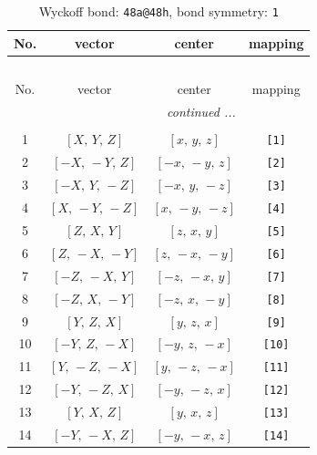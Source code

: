 \documentclass[fleqn,8pt]{jsarticle}
\begin{document}
\begin{longtable}{cccc}
\caption{Wyckoff bond: {\tt 48a@48h}, bond symmetry: {\tt 1}}
 \\
 \hline \hline
No. & vector & center & mapping \\ \hline \endfirsthead

\multicolumn{3}{l}{\tablename\ \thetable{}} \\
 \hline \hline
No. & vector & center & mapping \\ \hline \endhead

 \hline \hline
\multicolumn{3}{r}{\footnotesize\it continued ...} \\ \endfoot

 \hline \hline
\multicolumn{3}{r}{} \\ \endlastfoot

1 & $\left[ X,\, Y,\, Z \right]$ & $\left[ x,\, y,\, z \right]$ & {\tt [1]} \\ \hline
2 & $\left[ - X,\, - Y,\, Z \right]$ & $\left[ - x,\, - y,\, z \right]$ & {\tt [2]} \\ \hline
3 & $\left[ - X,\, Y,\, - Z \right]$ & $\left[ - x,\, y,\, - z \right]$ & {\tt [3]} \\ \hline
4 & $\left[ X,\, - Y,\, - Z \right]$ & $\left[ x,\, - y,\, - z \right]$ & {\tt [4]} \\ \hline
5 & $\left[ Z,\, X,\, Y \right]$ & $\left[ z,\, x,\, y \right]$ & {\tt [5]} \\ \hline
6 & $\left[ Z,\, - X,\, - Y \right]$ & $\left[ z,\, - x,\, - y \right]$ & {\tt [6]} \\ \hline
7 & $\left[ - Z,\, - X,\, Y \right]$ & $\left[ - z,\, - x,\, y \right]$ & {\tt [7]} \\ \hline
8 & $\left[ - Z,\, X,\, - Y \right]$ & $\left[ - z,\, x,\, - y \right]$ & {\tt [8]} \\ \hline
9 & $\left[ Y,\, Z,\, X \right]$ & $\left[ y,\, z,\, x \right]$ & {\tt [9]} \\ \hline
10 & $\left[ - Y,\, Z,\, - X \right]$ & $\left[ - y,\, z,\, - x \right]$ & {\tt [10]} \\ \hline
11 & $\left[ Y,\, - Z,\, - X \right]$ & $\left[ y,\, - z,\, - x \right]$ & {\tt [11]} \\ \hline
12 & $\left[ - Y,\, - Z,\, X \right]$ & $\left[ - y,\, - z,\, x \right]$ & {\tt [12]} \\ \hline
13 & $\left[ Y,\, X,\, Z \right]$ & $\left[ y,\, x,\, z \right]$ & {\tt [13]} \\ \hline
14 & $\left[ - Y,\, - X,\, Z \right]$ & $\left[ - y,\, - x,\, z \right]$ & {\tt [14]} \\ \hline

\end{longtable}
\end{document}
